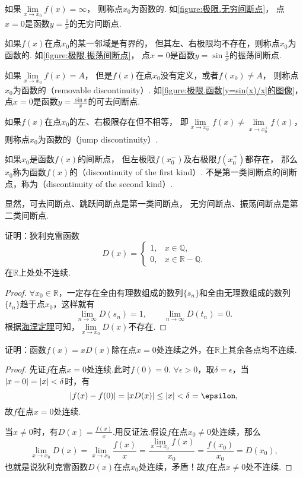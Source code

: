 如果\(\lim\limits_{x \to x_0}f(x) = \infty\)，
则称点\(x_0\)为函数的.
如\cref{figure:极限.无穷间断点}，
点\(x=0\)是函数\(y=\frac{1}{x}\)的无穷间断点.

如果\(f(x)\)在点\(x_0\)的某一邻域是有界的，
但其左、右极限均不存在，则称点\(x_0\)为函数的.
如\cref{figure:极限.振荡间断点}，
点\(x=0\)是函数\(y=\sin\frac{1}{x}\)的振荡间断点.

如果\(\lim\limits_{x \to x_0}f(x) = A\)，
但是\(f(x)\)在点\(x_0\)没有定义，或者\(f(x_0) \neq A\)，
则称点\(x_0\)为函数的（removable discontinuity）.
如\cref{figure:极限.函数[y=sin(x)/x]的图像}，
点\(x=0\)是函数\(y=\frac{\sin x}{x}\)的可去间断点.

如果\(f(x)\)在点\(x_0\)的左、右极限存在但不相等，
即\(\lim\limits_{x \to x_0^-}f(x) \neq \lim\limits_{x \to x_0^+}f(x)\)，
则称点\(x_0\)为函数的（jump discontinuity）.

如果\(x_0\)是函数\(f(x)\)的间断点，
但左极限\(f(x_0^-)\)及右极限\(f(x_0^+)\)都存在，
那么\(x_0\)称为函数\(f(x)\)的（discontinuity of the first kind）.
不是第一类间断点的间断点，称为（discontinuity of the second kind）.

显然，可去间断点、跳跃间断点是第一类间断点，
无穷间断点、振荡间断点是第二类间断点.

\begin{example}\label{example:极限.狄利克雷函数在实数域上处处不连续}
证明：狄利克雷函数\[
D(x) = \left\{ \begin{array}{ll}
1, & x \in \mathbb{Q}, \\
0, & x \in \mathbb{R} - \mathbb{Q}.
\end{array} \right.
\]在\(\mathbb{R}\)上处处不连续.
\begin{proof}
\(\forall x_0 \in \mathbb{R}\)，一定存在全由有理数组成的数列\(\{s_n\}\)和全由无理数组成的数列\(\{t_n\}\)趋于点\(x_0\)，这样就有\[
\lim\limits_{n\to\infty} D(s_n) = 1,
\qquad
\lim\limits_{n\to\infty} D(t_n) = 0.
\]
根据\hyperref[theorem:极限.海涅定理]{海涅定理}可知，\(\lim\limits_{x \to x_0} D(x)\)不存在.
\end{proof}
\end{example}

\begin{example}
证明：函数\(f(x) = x D(x)\)除在点\(x = 0\)处连续之外，在\(\mathbb{R}\)上其余各点均不连续.
\begin{proof}
先证\(f\)在点\(x = 0\)处连续.此时\(f(0) = 0\).
\(\forall \epsilon > 0\)，取\(\delta = \epsilon\)，当\(\abs{x - 0} = \abs{x} < \delta\)时，有\[
\abs{f(x) - f(0)}
= \abs{ x D(x) }
\leq \abs{x} < \delta = \epsilon,
\]故\(f\)在点\(x = 0\)处连续.

当\(x \neq 0\)时，有\(D(x) = \frac{f(x)}{x}\).用反证法.假设\(f\)在点\(x_0 \neq 0\)处连续，那么\[
\lim\limits_{x \to x_0} D(x) = \lim\limits_{x \to x_0} \frac{f(x)}{x}
= \frac{ \lim\limits_{x \to x_0} f(x) }{x_0}
= \frac{f(x_0)}{x_0} = D(x_0),
\]也就是说狄利克雷函数\(D(x)\)在点\(x_0\)处连续，矛盾！故\(f\)在点\(x \neq 0\)处不连续.
\end{proof}
\end{example}

